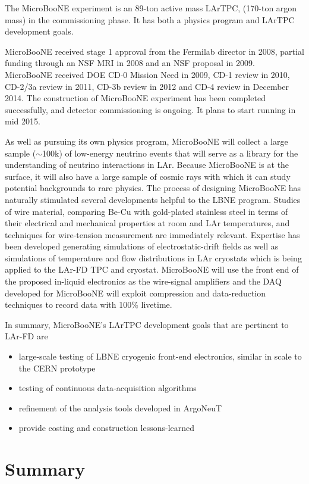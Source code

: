 The MicroBooNE experiment is an 89-ton active mass LArTPC, (170-ton argon mass) in the commissioning phase.  It has both a physics program and LArTPC development goals.  

MicroBooNE received stage 1 approval from the Fermilab director in 2008, partial funding through an NSF MRI in 2008 and an NSF proposal in 2009.  MicroBooNE received DOE CD-0 Mission Need in 2009, CD-1 review in 2010, CD-2/3a review in 2011, CD-3b review in 2012 and CD-4 review in December 2014. The construction of MicroBooNE experiment has been completed successfully, and detector commissioning is ongoing. It plans to start running in mid 2015. 

As well as pursuing its own physics program, MicroBooNE will collect a large sample ($\sim$100k) of low-energy neutrino events that will serve as a library for the understanding of neutrino interactions in 
LAr. Because MicroBooNE is at the surface, it will also have a large sample of cosmic rays with which it can study potential backgrounds to rare physics. The process of designing MicroBooNE has naturally stimulated several developments helpful to the LBNE program.  Studies of wire material, comparing Be-Cu with gold-plated stainless steel in terms of their electrical and mechanical properties at room and LAr temperatures, and techniques for wire-tension measurement are immediately relevant. Expertise has been developed generating simulations of electrostatic-drift fields as well as simulations of temperature and flow distributions in LAr cryostats which is being applied to the LAr-FD TPC and cryostat. MicroBooNE will use the front end of the proposed in-liquid electronics as the wire-signal amplifiers and the DAQ developed for MicroBooNE will exploit compression and data-reduction techniques to record data with 100\% livetime.

\noindent  In summary, MicroBooNE's LArTPC development goals that are pertinent to LAr-FD are
\begin{itemize}
\item large-scale testing of LBNE cryogenic front-end electronics, similar in scale to the CERN prototype
\item testing of continuous data-acquisition algorithms
\item refinement of the analysis tools developed in ArgoNeuT
\item provide costing and construction lessons-learned
\end{itemize}

\section{Summary}

